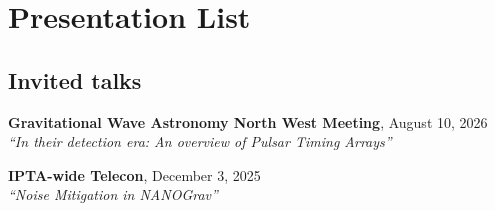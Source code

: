 \documentclass[11pt,letterpaper,sans,unicode]{moderncv}
\newcommand{\invtalkitem}[3]{\item \textbf{#1}, \hfill{#2} \\ \textit{\color{color1}``#3''} \vspace{-0.1cm}} %
\begin{document}
{%
\section{Presentation List}
\subsection{Invited talks} %
\renewcommand\labelenumi{\bfseries\theenumi .}

\begin{etaremune}[leftmargin=8mm]
\small
\invtalkitem{Gravitational Wave Astronomy North West Meeting}{August 10, 2026}{In their detection era: An overview of Pulsar Timing Arrays}
\invtalkitem{IPTA-wide Telecon}{December 3, 2025}{Noise Mitigation in NANOGrav}



\end{etaremune}
\vspace{-0.2cm}
}
\end{document}
